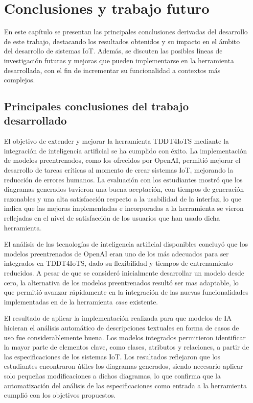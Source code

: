 \chapter{Conclusiones y trabajo futuro}\label{chapter:conclusiones}

En este capítulo se presentan las principales conclusiones derivadas del desarrollo de este trabajo, destacando los resultados obtenidos y su impacto en el ámbito del desarrollo de sistemas IoT. Además, se discuten las posibles líneas de investigación futuras y mejoras que pueden implementarse en la herramienta desarrollada, con el fin de incrementar su funcionalidad a contextos más complejos.

\section{Principales conclusiones del trabajo desarrollado}

El objetivo de extender y mejorar la herramienta TDDT4IoTS mediante la integración de inteligencia artificial se ha cumplido con éxito. La implementación de modelos preentrenados, como los ofrecidos por OpenAI, permitió mejorar el desarrollo de tareas críticas al momento de crear sistemas IoT, mejorando la reducción de errores humanos. La evaluación con los estudiantes mostró que los diagramas generados tuvieron una buena aceptación, con tiempos de generación razonables y una alta satisfacción respecto a la usabilidad de la interfaz, lo que indica que las mejoras implementadas e incorporadas a la herramienta se vieron reflejadas en el nivel de satisfacción de los usuarios que han usado dicha herramienta.

El análisis de las tecnologías de inteligencia artificial disponibles concluyó que los modelos preentrenados de OpenAI eran uno de los más adecuados para ser integrados en TDDT4IoTS, dado su flexibilidad y tiempos de entrenamiento reducidos. A pesar de que se consideró inicialmente desarrollar un modelo desde cero, la alternativa de los modelos preentrenados resultó ser mas adaptable, lo que permitió avanzar rápidamente en la integración de las nuevas funcionalidades implementadas en de la herramienta \textit{case} existente.

El resultado de aplicar la implementación realizada para que modelos de IA hicieran el análisis automático de descripciones textuales en forma de casos de uso fue considerablemente buena. Los modelos integrados permitieron identificar la mayor parte de elementos clave, como clases, atributos y relaciones, a partir de las especificaciones de los sistemas IoT. Los resultados reflejaron que los estudiantes encontraron útiles los diagramas generados, siendo necesario aplicar solo pequeñas modificaciones a dichos diagramas, lo que confirma que la automatización del análisis de las especificaciones como entrada a la herramienta cumplió con los objetivos propuestos.

